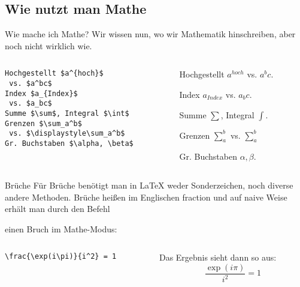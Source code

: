 \subsection{Wie nutzt man Mathe}

\begin{frame}[fragile]{Wie mache ich Mathe?}
Wir wissen nun, wo wir Mathematik hinschreiben, aber noch nicht wirklich wie.
\begin{columns}
\begin{column}{0.55\textwidth}
\begin{codeblock}
\begin{verbatim}
Hochgestellt $a^{hoch}$ 
 vs. $a^bc$
Index $a_{Index}$ 
 vs. $a_bc$
Summe $\sum$, Integral $\int$
Grenzen $\sum_a^b$ 
 vs. $\displaystyle\sum_a^b$
Gr. Buchstaben $\alpha, \beta$
\end{verbatim}
\end{codeblock}
\end{column}
\pause
\begin{column}{0.4\textwidth}
Hochgestellt $a^{hoch}$ vs. $a^bc$. 

\medskip\pause
Index $a_{Index}$ vs. $a_bc$.

\medskip\pause
Summe $\sum$, Integral $\int$.

\medskip\pause
Grenzen $\sum_a^b$ vs. $\displaystyle \sum_a^b$

\medskip\pause
Gr. Buchstaben $\alpha, \beta$.
\end{column}
\end{columns}
\end{frame}

\begin{frame}[fragile]{Brüche}
Für Brüche benötigt man in \LaTeX{} weder Sonderzeichen, noch diverse andere Methoden. Brüche heißen im Englischen \glqq fraction\grqq{} und auf naive Weise erhält man durch den Befehl
\begin{center}
\end{center}
einen Bruch im Mathe-Modus:
\begin{columns}
\begin{column}{0.55\textwidth}
\begin{codeblock}
\begin{verbatim}
\frac{\exp(i\pi)}{i^2} = 1
\end{verbatim}
\end{codeblock}
\end{column}
\begin{column}{0.35\textwidth}
Das Ergebnis sieht dann so aus:
\[
    \frac{\exp(i\pi)}{i^2} = 1
\]
\end{column}
\end{columns}
\end{frame}

